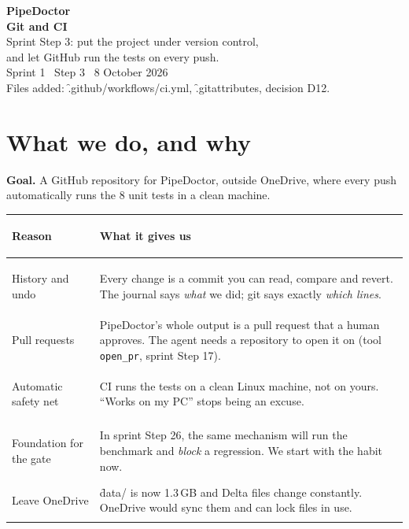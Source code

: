 \documentclass[11pt,a4paper]{article}
\let\oldsection\section
\renewcommand{\section}{\Needspace*{9\baselineskip}\oldsection}
\begin{document}
\sloppy

\begin{tcolorbox}[enhanced,colback=navy,colframe=navy,arc=4pt,boxrule=0pt,left=14pt,right=14pt,top=12pt,bottom=12pt]
{\color{white}
{\Huge\bfseries PipeDoctor\\[2pt]Git and CI}\\[8pt]
{\large Sprint Step 3: put the project under version control,\\ and let GitHub run the tests on every push.}\\[10pt]
{\small Sprint 1 \textperiodcentered\ Step 3 \textperiodcentered\ 8 October 2026\\
Files added: \f{.github/workflows/ci.yml}, \f{.gitattributes}, decision D12.}}
\end{tcolorbox}

\section{What we do, and why}
\begin{goal}\textbf{Goal.} A GitHub repository for PipeDoctor, outside OneDrive, where every push automatically runs the 8 unit tests in a clean machine.\end{goal}

\begin{tabularx}{\textwidth}{@{}>{\bfseries\raggedright\arraybackslash}p{3.2cm}X@{}}
\toprule
Reason & What it gives us \\
\midrule
History and undo & Every change is a commit you can read, compare and revert. The journal says \emph{what} we did; git says exactly \emph{which lines}. \\
Pull requests & PipeDoctor's whole output is a pull request that a human approves. The agent needs a repository to open it on (tool \texttt{open\_pr}, sprint Step 17). \\
Automatic safety net & CI runs the tests on a clean Linux machine, not on yours. ``Works on my PC'' stops being an excuse. \\
Foundation for the gate & In sprint Step 26, the same mechanism will run the benchmark and \emph{block} a regression. We start with the habit now. \\
Leave OneDrive & \f{data/} is now 1.3\,GB and Delta files change constantly. OneDrive would sync them and can lock files in use. \\
\bottomrule
\end{tabularx}
\end{document}
